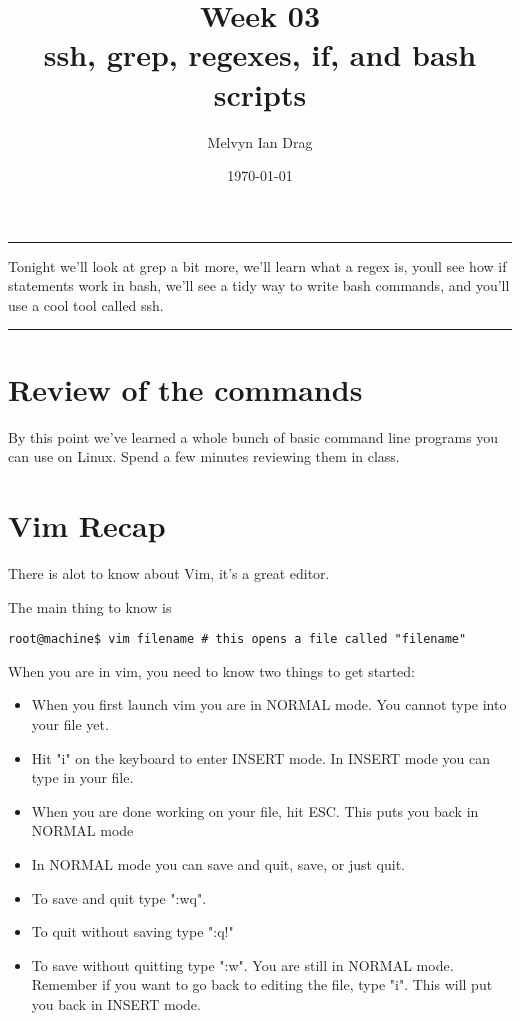 \documentclass[12pt,a4paper]{article}
\title{\textbf{Week 03} \\
ssh, grep, regexes, if, and bash scripts
}
\author{
	Melvyn Ian Drag
}
\date{\today}
\renewenvironment{abstract}{%
\hfill\begin{minipage}{0.95\textwidth}
\rule{\textwidth}{1pt}}
{\par\noindent\rule{\textwidth}{1pt}\end{minipage}}
\begin{document}
\maketitle

\begin{abstract}
Tonight we'll look at grep a bit more, we'll learn what a regex is, youll see
how if statements work in bash, we'll see a tidy way to write bash commands, and
you'll use a cool tool called ssh.
\end{abstract}

\section{Review of the commands}
By this point we've learned a whole bunch of basic command line programs you
can use on Linux. Spend a few minutes reviewing them in class.

\section{Vim Recap}
There is alot to know about Vim, it's a great editor.

The main thing to know is

\begin{lstlisting}
root@machine$ vim filename # this opens a file called "filename"
\end{lstlisting}

When you are in vim, you need to know two things to get started:


\begin{itemize}
\item When you first launch vim you are in NORMAL mode. You cannot type into
your file yet.
\item Hit "i" on the keyboard to enter INSERT mode. In INSERT mode you can type
in your file.
\item When you are done working on your file, hit ESC. This puts you back in
NORMAL mode
\item In NORMAL mode you can save and quit, save, or just quit.
\item To save and quit type ":wq".
\item To quit without saving type ":q!"
\item To save without quitting type ":w". You are still in NORMAL mode. Remember
if you want to go back to editing the file, type "i". This will put you back in
INSERT mode.
\end{itemize}
\end{document}
